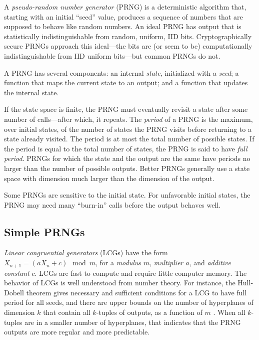 \documentclass[graybox]{svmult}
\begin{document}
A \emph{pseudo-random number generator} (PRNG) is a deterministic algorithm that, starting with
an initial ``seed'' value, produces a sequence of numbers that are supposed to behave like 
random numbers.
An ideal PRNG has output that is statistically indistinguishable from random, uniform, IID bits. 
Cryptographically secure PRNGs approach this ideal---the bits are (or seem to be) computationally 
indistinguishable from IID uniform bits---but common PRNGs do not.

A PRNG has several components:
an internal \emph{state}, initialized with a \emph{seed};
a function that maps the current state to an output;
and a function that updates the internal state.

If the state space is finite, the PRNG must eventually revisit a state after some number of calls---after 
which, it repeats.
The \emph{period} of a PRNG is the maximum, over initial states, of the number of states 
the PRNG visits before returning to a state already visited.
The period is at most the total number of possible states.
If the period is equal to the total number of states, the PRNG is said to have \emph{full period}.
PRNGs for which the state and the output are the same have periods no larger than the number of possible outputs.
Better PRNGs generally use a state space with dimension much larger than the dimension of the output.

Some PRNGs are sensitive to the initial state.
For unfavorable initial states, the PRNG may need many ``burn-in'' calls before the output behaves well.

\subsection{Simple PRNGs}



\emph{Linear congruential generators} (LCGs) have the form $X_{n+1} = (a X_n + c) \mod m$, for a 
\emph{modulus} $m$, \emph{multiplier} $a$, and \emph{additive constant} $c$.
LCGs are fast to compute and require little computer memory.
The behavior of LCGs is well understood from number theory.
For instance, the Hull-Dobell theorem \cite{hullDobell62}
gives necessary and sufficient conditions for a LCG to have full period for all seeds,
and there are upper bounds on the number of hyperplanes of dimension $k$
that contain all $k$-tuples of outputs, as a function of $m$ \cite{marsaglia_random_1968}.
When all $k$-tuples are in a smaller number of hyperplanes, that indicates that
the PRNG outputs are more regular and more predictable.
\end{document}
